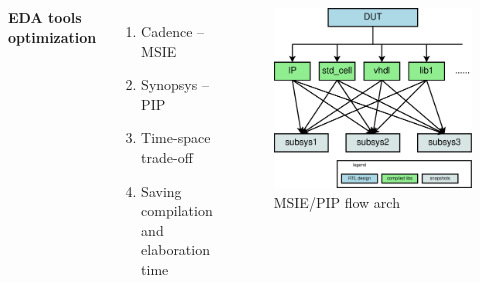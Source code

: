 \documentclass{beamer}
\begin{document}
\begin{frame}
  \begin{columns}[c] %

    \textbf{EDA tools optimization}
    \begin{enumerate}
    \item Cadence -- MSIE
    \item Synopsys -- PIP
    \item Time-space trade-off
    \item Saving compilation and elaboration time
    \end{enumerate}

    \begin{figure}
      \centering
      \includegraphics[width=0.9\linewidth]{pm_mapping}
      \caption{MSIE/PIP flow arch}
    \end{figure}

  \end{columns}
\end{frame}
\end{document}
